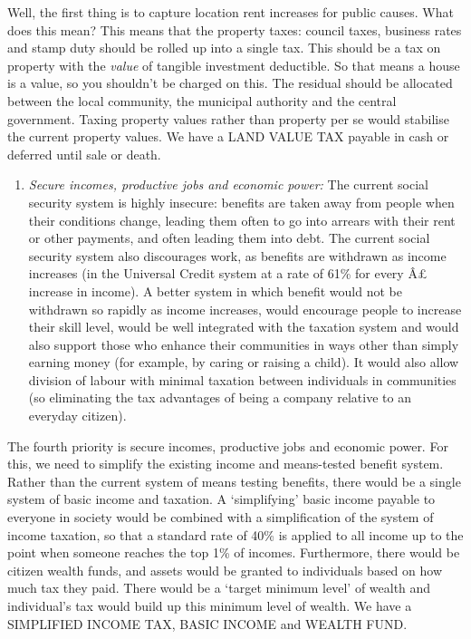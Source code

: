 \documentclass[]{tufte-handout}
\providecommand{\tightlist}{%
  \setlength{\itemsep}{0pt}\setlength{\parskip}{0pt}}
\begin{document}
Well, the first thing is to capture location rent increases for public
causes. What does this mean? This means that the property taxes: council
taxes, business rates and stamp duty should be rolled up into a single
tax. This should be a tax on property with the \emph{value} of tangible
investment deductible. So that means a house is a value, so you
shouldn't be charged on this. The residual should be allocated between
the local community, the municipal authority and the central government.
Taxing property values rather than property per se would stabilise the
current property values. We have a LAND VALUE TAX payable in cash or
deferred until sale or death.

\begin{enumerate}
\def\labelenumi{\arabic{enumi}.}
\tightlist
\item
  \emph{Secure incomes, productive jobs and economic power:} The current
  social security system is highly insecure: benefits are taken away
  from people when their conditions change, leading them often to go
  into arrears with their rent or other payments, and often leading them
  into debt. The current social security system also discourages work,
  as benefits are withdrawn as income increases (in the Universal Credit
  system at a rate of 61\% for every Â£ increase in income). A better
  system in which benefit would not be withdrawn so rapidly as income
  increases, would encourage people to increase their skill level, would
  be well integrated with the taxation system and would also support
  those who enhance their communities in ways other than simply earning
  money (for example, by caring or raising a child). It would also allow
  division of labour with minimal taxation between individuals in
  communities (so eliminating the tax advantages of being a company
  relative to an everyday citizen).
\end{enumerate}

The fourth priority is secure incomes, productive jobs and economic
power. For this, we need to simplify the existing income and
means-tested benefit system. Rather than the current system of means
testing benefits, there would be a single system of basic income and
taxation. A `simplifying' basic income payable to everyone in society
would be combined with a simplification of the system of income
taxation, so that a standard rate of 40\% is applied to all income up to
the point when someone reaches the top 1\% of incomes. Furthermore,
there would be citizen wealth funds, and assets would be granted to
individuals based on how much tax they paid. There would be a `target
minimum level' of wealth and individual's tax would build up this
minimum level of wealth. We have a SIMPLIFIED INCOME TAX, BASIC INCOME
and WEALTH FUND.
\end{document}
